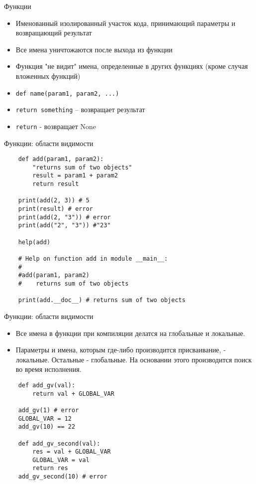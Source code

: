 \documentclass{article}
\begin{document}
\LARGE

\begin{center}Функции\end{center}
\begin{itemize}
    \item Именованный изолированный участок кода,
        принимающий параметры и возвращающий результат
    \item Все имена уничтожаются после выхода из функции
    \item Функция "не видит" имена, определенные в других
        функциях (кроме случая вложенных функций)
    \item \lstinline!def name(param1, param2, ...)!
    \item \lstinline!return something! – возвращает результат
    \item \lstinline!return! - возвращает None
\end{itemize}
\newpage

\begin{center} Функции: области видимости \end{center}
\begin{lstlisting}
    def add(param1, param2):
        "returns sum of two objects"
        result = param1 + param2
        return result

    print(add(2, 3)) # 5
    print(result) # error
    print(add(2, "3")) # error
    print(add("2", "3")) #"23"

    help(add)

    # Help on function add in module __main__:
    #
    #add(param1, param2)
    #    returns sum of two objects

    print(add.__doc__) # returns sum of two objects
\end{lstlisting}
\newpage

\begin{center} Функции: области видимости \end{center}
\begin{itemize}
    \item Все имена в функции при компиляции делатся на глобальные и локальные.
    \item Параметры и имена, которым где-либо производится присваивание, - локальные.
          Остальные - глобальные. На основании этого производится поиск во время исполнения.
\end{itemize}
\begin{lstlisting}
    def add_gv(val):
        return val + GLOBAL_VAR

    add_gv(1) # error
    GLOBAL_VAR = 12
    add_gv(10) == 22

    def add_gv_second(val):
        res = val + GLOBAL_VAR
        GLOBAL_VAR = val
        return res
    add_gv_second(10) # error
\end{lstlisting}
\newpage
\end{document}
